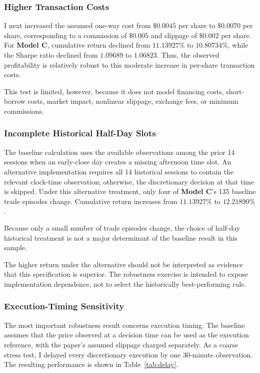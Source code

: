 \documentclass{article}
\begin{document}
\subsubsection{Higher Transaction Costs}

I next increased the assumed one-way cost from \(\$0.0045\) per share to \(\$0.0070\) per share, corresponding to a commission of \(\$0.005\) and slippage of \(\$0.002\) per share. For\textbf{ Model C}, cumulative return declined from \(11.13927\%\) to \(10.80734\%\), while the Sharpe ratio declined from \(1.09689\) to \(1.06823\). Thus, the observed profitability is relatively robust to this moderate increase in per-share transaction costs.

This test is limited, however, because it does not model financing costs, short-borrow costs, market impact, nonlinear slippage, exchange fees, or minimum commissions.

\subsubsection{Incomplete Historical Half-Day Slots}

The baseline calculation uses the available observations among the prior 14 sessions when an early-close day creates a missing afternoon time slot. An alternative implementation requires all 14 historical sessions to contain the relevant clock-time observation; otherwise, the discretionary decision at that time is skipped. Under this alternative treatment, only four of\textbf{ Model C}'s 135 baseline trade episodes change. Cumulative return increases from \(11.13927\%\) to \(12.21890\%\).

Because only a small number of trade episodes change, the choice of half-day historical treatment is not a major determinant of the baseline result in this sample.

The higher return under the alternative should not be interpreted as evidence that this specification is superior. The robustness exercise is intended to expose implementation dependence, not to select the historically best-performing rule.

\subsubsection{Execution-Timing Sensitivity}

The most important robustness result concerns execution timing. The baseline assumes that the price observed at a decision time can be used as the execution reference, with the paper's assumed slippage charged separately. As a coarse stress test, I delayed every discretionary execution by one 30-minute observation. The resulting performance is shown in Table~\ref{tab:delay}.
\end{document}
